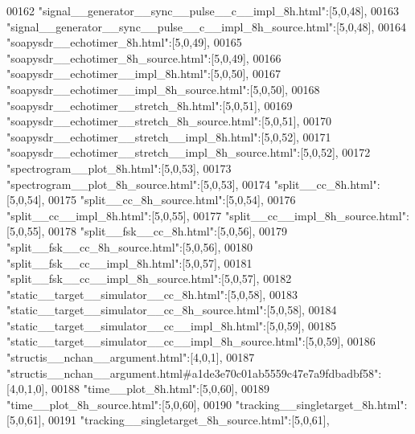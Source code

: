 \begin{DoxyCode}
00162 \textcolor{stringliteral}{"signal\_\_generator\_\_sync\_\_pulse\_\_c\_\_impl\_8h.html"}:[5,0,48],
00163 \textcolor{stringliteral}{"signal\_\_generator\_\_sync\_\_pulse\_\_c\_\_impl\_8h\_source.html"}:[5,0,48],
00164 \textcolor{stringliteral}{"soapysdr\_\_echotimer\_8h.html"}:[5,0,49],
00165 \textcolor{stringliteral}{"soapysdr\_\_echotimer\_8h\_source.html"}:[5,0,49],
00166 \textcolor{stringliteral}{"soapysdr\_\_echotimer\_\_impl\_8h.html"}:[5,0,50],
00167 \textcolor{stringliteral}{"soapysdr\_\_echotimer\_\_impl\_8h\_source.html"}:[5,0,50],
00168 \textcolor{stringliteral}{"soapysdr\_\_echotimer\_\_stretch\_8h.html"}:[5,0,51],
00169 \textcolor{stringliteral}{"soapysdr\_\_echotimer\_\_stretch\_8h\_source.html"}:[5,0,51],
00170 \textcolor{stringliteral}{"soapysdr\_\_echotimer\_\_stretch\_\_impl\_8h.html"}:[5,0,52],
00171 \textcolor{stringliteral}{"soapysdr\_\_echotimer\_\_stretch\_\_impl\_8h\_source.html"}:[5,0,52],
00172 \textcolor{stringliteral}{"spectrogram\_\_plot\_8h.html"}:[5,0,53],
00173 \textcolor{stringliteral}{"spectrogram\_\_plot\_8h\_source.html"}:[5,0,53],
00174 \textcolor{stringliteral}{"split\_\_cc\_8h.html"}:[5,0,54],
00175 \textcolor{stringliteral}{"split\_\_cc\_8h\_source.html"}:[5,0,54],
00176 \textcolor{stringliteral}{"split\_\_cc\_\_impl\_8h.html"}:[5,0,55],
00177 \textcolor{stringliteral}{"split\_\_cc\_\_impl\_8h\_source.html"}:[5,0,55],
00178 \textcolor{stringliteral}{"split\_\_fsk\_\_cc\_8h.html"}:[5,0,56],
00179 \textcolor{stringliteral}{"split\_\_fsk\_\_cc\_8h\_source.html"}:[5,0,56],
00180 \textcolor{stringliteral}{"split\_\_fsk\_\_cc\_\_impl\_8h.html"}:[5,0,57],
00181 \textcolor{stringliteral}{"split\_\_fsk\_\_cc\_\_impl\_8h\_source.html"}:[5,0,57],
00182 \textcolor{stringliteral}{"static\_\_target\_\_simulator\_\_cc\_8h.html"}:[5,0,58],
00183 \textcolor{stringliteral}{"static\_\_target\_\_simulator\_\_cc\_8h\_source.html"}:[5,0,58],
00184 \textcolor{stringliteral}{"static\_\_target\_\_simulator\_\_cc\_\_impl\_8h.html"}:[5,0,59],
00185 \textcolor{stringliteral}{"static\_\_target\_\_simulator\_\_cc\_\_impl\_8h\_source.html"}:[5,0,59],
00186 \textcolor{stringliteral}{"structis\_\_nchan\_\_argument.html"}:[4,0,1],
00187 \textcolor{stringliteral}{"structis\_\_nchan\_\_argument.html#a1de3e70c01ab5559c47e7a9fdbadbf58"}:[4,0,1,0],
00188 \textcolor{stringliteral}{"time\_\_plot\_8h.html"}:[5,0,60],
00189 \textcolor{stringliteral}{"time\_\_plot\_8h\_source.html"}:[5,0,60],
00190 \textcolor{stringliteral}{"tracking\_\_singletarget\_8h.html"}:[5,0,61],
00191 \textcolor{stringliteral}{"tracking\_\_singletarget\_8h\_source.html"}:[5,0,61],

\end{DoxyCode}
